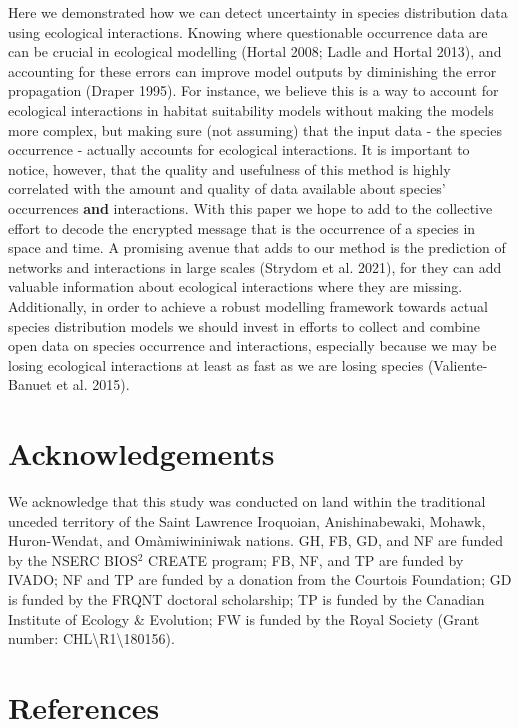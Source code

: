 \documentclass[11pt]{article}
\begin{document}
Here we demonstrated how we can detect uncertainty in species
distribution data using ecological interactions. Knowing where
questionable occurrence data are can be crucial in ecological modelling
(Hortal 2008; Ladle and Hortal 2013), and accounting for these errors
can improve model outputs by diminishing the error propagation (Draper
1995). For instance, we believe this is a way to account for ecological
interactions in habitat suitability models without making the models
more complex, but making sure (not assuming) that the input data - the
species occurrence - actually accounts for ecological interactions. It
is important to notice, however, that the quality and usefulness of this
method is highly correlated with the amount and quality of data
available about species' occurrences \textbf{and} interactions. With
this paper we hope to add to the collective effort to decode the
encrypted message that is the occurrence of a species in space and time.
A promising avenue that adds to our method is the prediction of networks
and interactions in large scales (Strydom et al. 2021), for they can add
valuable information about ecological interactions where they are
missing. Additionally, in order to achieve a robust modelling framework
towards actual species distribution models we should invest in efforts
to collect and combine open data on species occurrence and interactions,
especially because we may be losing ecological interactions at least as
fast as we are losing species (Valiente-Banuet et al. 2015).

\hypertarget{acknowledgements}{%
\section{Acknowledgements}\label{acknowledgements}}

We acknowledge that this study was conducted on land within the
traditional unceded territory of the Saint Lawrence Iroquoian,
Anishinabewaki, Mohawk, Huron-Wendat, and Omàmiwininiwak nations. GH,
FB, GD, and NF are funded by the NSERC BIOS\(^2\) CREATE program; FB,
NF, and TP are funded by IVADO; NF and TP are funded by a donation from
the Courtois Foundation; GD is funded by the FRQNT doctoral scholarship;
TP is funded by the Canadian Institute of Ecology \& Evolution; FW is
funded by the Royal Society (Grant number:
CHL\textbackslash R1\textbackslash180156).

\hypertarget{references}{%
\section*{References}\label{references}}
\end{document}
